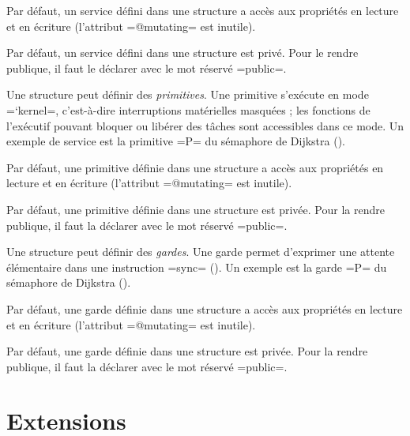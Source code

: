 Par défaut, un service défini dans une structure a accès aux propriétés en lecture et en écriture (l'attribut \plm=@mutating= est inutile).

Par défaut, un service défini dans une structure est privé. Pour le rendre publique, il faut le déclarer avec le mot réservé \plm=public=.










Une structure peut définir des \emph{primitives}. Une primitive s'exécute en mode \plm=`kernel=, c'est-à-dire interruptions matérielles masquées ; les fonctions de l'exécutif pouvant bloquer ou libérer des tâches sont accessibles dans ce mode. Un exemple de service est la primitive \plm=P= du sémaphore de Dijkstra ().

Par défaut, une primitive définie dans une structure a accès aux propriétés en lecture et en écriture (l'attribut \plm=@mutating= est inutile).

Par défaut, une primitive définie dans une structure est privée. Pour la rendre publique, il faut la déclarer avec le mot réservé \plm=public=.










Une structure peut définir des \emph{gardes}. Une garde permet d'exprimer une attente élémentaire dans une instruction \plm=sync= (). Un exemple est la garde \plm=P= du sémaphore de Dijkstra ().

Par défaut, une garde définie dans une structure a accès aux propriétés en lecture et en écriture (l'attribut \plm=@mutating= est inutile).

Par défaut, une garde définie dans une structure est privée. Pour la rendre publique, il faut la déclarer avec le mot réservé \plm=public=.






\section{Extensions}

